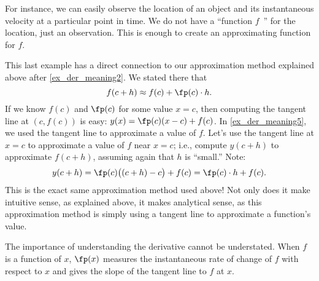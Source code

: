 For instance, we can easily observe the location of an object and its instantaneous velocity at a particular point in time. We do not have a ``function $f$\ '' for the location, just an observation. This is enough to create an approximating function for $f$.

This last example has a direct connection to our approximation method explained above after \autoref{ex_der_meaning2}. We stated there that
\[f(c+h) \approx f(c)+\fp(c)\cdot h.\]
If we know $f(c)$ and $\fp(c)$ for some value $x=c$, then computing the tangent line at $(c,f(c))$ is easy: $y(x) = \fp(c)(x-c)+f(c)$. In \autoref{ex_der_meaning5}, we used the tangent line to approximate a value of $f$. Let's use the tangent line at $x=c$ to approximate a value of $f$ near $x=c$; i.e., compute $y(c+h)$ to approximate $f(c+h)$, assuming again that $h$ is ``small.'' Note:
\[y(c+h) = \fp(c)\big((c+h)-c\big)+f(c) = \fp(c)\cdot h + f(c).\]
This is the exact same approximation method used above! Not only does it make intuitive sense, as explained above, it makes analytical sense, as this approximation method is simply using a tangent line to approximate a function's value.\bigskip\bigskip


The importance of understanding the derivative cannot be understated. When $f$ is a function of $x$, $\fp(x)$ measures the instantaneous rate of change of $f$ with respect to $x$ and gives the slope of the tangent line to $f$ at $x$.


